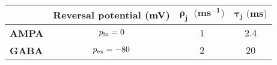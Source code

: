 \begin{tabular}{l|c|c|c|}
    \cline{2-4}
    \textbf{}                                                     & \cellcolor{main-color}\textbf{Reversal potential (mV)} & \cellcolor{main-color}\textbf{$\pmb{\rho_{j} \; \text{ (} ms^{-1} \text{)}}$} & \cellcolor{main-color}\textbf{$\pmb{\tau_{j} \text{ (} ms \text{)}}$} \\ \hline
    \multicolumn{1}{|l|}{\cellcolor{main-color}\textbf{AMPA}}   & $p_{\mathrm{in}} = 0$                                             & $1$                                                                              & $2.4$                                                                       \\ \hline
    \multicolumn{1}{|l|}{\cellcolor{main-color}\textbf{GABA}} & $p_{\mathrm{ex}} = -80$                                           & $2$                                                                              & $20$                                                                        \\ \hline
\end{tabular}